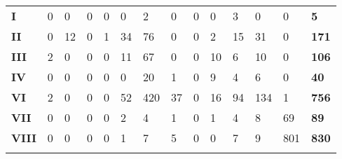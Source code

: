 \documentclass[output=paper]{langscibook}
\begin{document}
\begin{sidewaystable}[]
\begin{tabular}{@{}llllllllllllll@{}}
	\textbf{I} & 0 & 0 & 0 & 0 & 0 & 2 & 0 & 0 & 0 & 3 & 0 & 0 & \textbf{5} \\
	\textbf{II} & 0 & 12 & 0 & 1 & 34 & 76 & 0 & 0 & 2 & 15 & 31 & 0 & \textbf{171} \\
	\textbf{III} & 2 & 0 & 0 & 0 & 11 & 67 & 0 & 0 & 10 & 6 & 10 & 0 & \textbf{106} \\
	\textbf{IV} & 0 & 0 & 0 & 0 & 0 & 20 & 1 & 0 & 9 & 4 & 6 & 0 & \textbf{40} \\
	\textbf{VI} & 2 & 0 & 0 & 0 & 52 & 420 & 37 & 0 & 16 & 94 & 134 & 1 & \textbf{756} \\
	\textbf{VII} & 0 & 0 & 0 & 0 & 2 & 4 & 1 & 0 & 1 & 4 & 8 & 69 & \textbf{89} \\
	\textbf{VIII} & 0 & 0 & 0 & 0 & 1 & 7 & 5 & 0 & 0 & 7 & 9 & 801 & \textbf{830} \\ \lspbottomrule
	\end{tabular}
\end{sidewaystable}

\clearpage
{}
{\sloppy\printbibliography[heading=subbibliography,notkeyword=this]}
\end{document}
